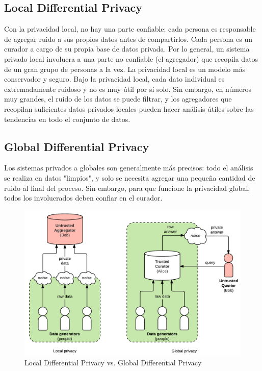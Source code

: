 \documentclass[
11pt, %
oneside, %
spanish, %
singlespacing, %
parskip, %
headsepline, %
chapterinoneline, %
]{MastersDoctoralThesis} %
\begin{document}
\subsection{Local Differential Privacy}
Con la privacidad local, no hay una parte confiable; cada persona es responsable de agregar ruido a sus propios datos antes de compartirlos. Cada persona es un curador a cargo de su propia base de datos privada. Por lo general, un sistema privado local involucra a una parte no confiable (el agregador) que recopila datos de un gran grupo de personas a la vez.
La privacidad local es un modelo más conservador y seguro. Bajo la privacidad local, cada dato individual es extremadamente ruidoso y no es muy útil por sí solo. Sin embargo, en números muy grandes, el ruido de los datos se puede filtrar, y los agregadores que recopilan suficientes datos privados locales pueden hacer análisis útiles sobre las tendencias en todo el conjunto de datos.

\subsection{Global Differential Privacy}
Los sistemas privados a globales son generalmente más precisos: todo el análisis se realiza en datos "limpios", y solo se necesita agregar una pequeña cantidad de ruido al final del proceso. Sin embargo, para que funcione la privacidad global, todos los involucrados deben confiar en el curador. \\


\begin{figure}[H]
  	\centering
	\includegraphics[scale=0.7]{imgs/diff-privacy.png}
	\caption{Local Differential Privacy vs. Global Differential Privacy}
\end{figure}
\end{document}
